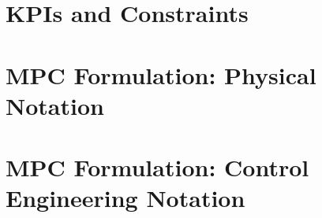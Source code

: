 \documentclass[10pt]{extarticle}
\begin{document}
\section{KPIs and Constraints}\label{sec:variables}


\section{MPC Formulation: Physical Notation}\label{sec:physical_notation}





\section{MPC Formulation: Control Engineering Notation}\label{sec:control_notation}
\end{document}
